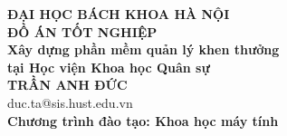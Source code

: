 \documentclass[DoAn.tex]{subfiles}
\begin{document}
\begin{titlepage}
\thispagestyle{empty}
\begin{center}

{\textbf{\large{ĐẠI HỌC BÁCH KHOA HÀ NỘI}}}\\[4cm]

{\textbf{\huge{ĐỒ ÁN TỐT NGHIỆP}}}\\[1cm]
{\textbf{\Large{Xây dựng phần mềm quản lý khen thưởng\\ tại Học viện Khoa học Quân sự}}}\\[1cm]

{\textbf{\large{TRẦN ANH ĐỨC}}}\\
{\large{duc.ta@sis.hust.edu.vn}}\\[0.5cm]

{\textbf{\large{Chương trình đào tạo: Khoa học máy tính}}}\\

\vspace{3.5cm}
\begin{table}[H]
\centering
{}
\end{table}
\end{center}
\end{titlepage}
\end{document}
